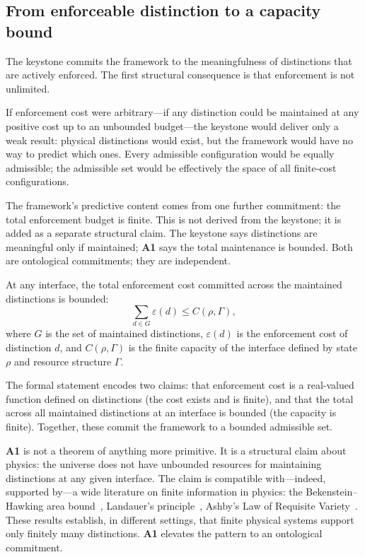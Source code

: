 \documentclass[11pt]{article}
\newcommand{\Aone}{\textbf{A1}}
\begin{document}
\subsection{From enforceable distinction to a capacity bound}\label{sec:A1_motivation}

The keystone commits the framework to the meaningfulness of distinctions that are actively enforced. The first structural consequence is that enforcement is not unlimited.

If enforcement cost were arbitrary---if any distinction could be maintained at any positive cost up to an unbounded budget---the keystone would deliver only a weak result: physical distinctions would exist, but the framework would have no way to predict which ones. Every admissible configuration would be equally admissible; the admissible set would be effectively the space of all finite-cost configurations.

The framework's predictive content comes from one further commitment: the total enforcement budget is finite. This is not derived from the keystone; it is added as a separate structural claim. The keystone says distinctions are meaningful only if maintained; \textbf{A1} says the total maintenance is bounded. Both are ontological commitments; they are independent.

\begin{tcolorbox}[apfbox, title={Axiom A1 --- Finite Enforcement Capacity}]
At any interface, the total enforcement cost committed across the maintained distinctions is bounded:
\[
\sum_{d \in G} \varepsilon(d) \leq C(\rho, \Gamma),
\]
where $G$ is the set of maintained distinctions, $\varepsilon(d)$ is the enforcement cost of distinction $d$, and $C(\rho, \Gamma)$ is the finite capacity of the interface defined by state $\rho$ and resource structure $\Gamma$.
\end{tcolorbox}

The formal statement encodes two claims: that enforcement cost is a real-valued function defined on distinctions (the cost exists and is finite), and that the total across all maintained distinctions at an interface is bounded (the capacity is finite). Together, these commit the framework to a bounded admissible set.

\Aone{} is not a theorem of anything more primitive. It is a structural claim about physics: the universe does not have unbounded resources for maintaining distinctions at any given interface. The claim is compatible with---indeed, supported by---a wide literature on finite information in physics: the Bekenstein--Hawking area bound~\cite{Bekenstein1981}, Landauer's principle~\cite{Landauer1961}, Ashby's Law of Requisite Variety~\cite{Ashby1956}. These results establish, in different settings, that finite physical systems support only finitely many distinctions. \Aone{} elevates the pattern to an ontological commitment.
\end{document}
